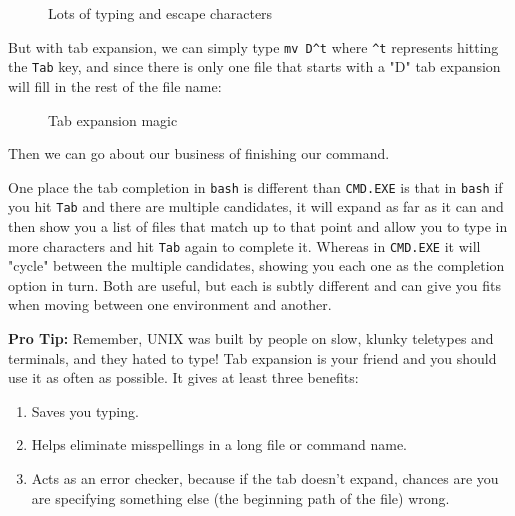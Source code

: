 \documentclass[10pt,american,]{book}
\newenvironment{Shaded}{\begin{snugshade}}{\end{snugshade}}
\newcommand{\KeywordTok}[1]{\textcolor[rgb]{0.13,0.29,0.53}{\textbf{{#1}}}}
\newcommand{\DataTypeTok}[1]{\textcolor[rgb]{0.13,0.29,0.53}{{#1}}}
\newcommand{\NormalTok}[1]{{#1}}
\numberwithin{figure}{chapter}
\DeclareRobustCommand{\drcap}[1]{\begin{figure}[H]\caption{#1}\end{figure}}
\renewcommand{\KeywordTok}[1]{{#1}}
\renewcommand{\DataTypeTok}[1]{{#1}}
\renewcommand{\NormalTok}[1]{{#1}}
\begin{document}
\drcap{Lots of typing and escape characters}

\begin{Shaded}
\end{Shaded}

But with tab expansion, we can simply type \texttt{mv\ D\^{}t} where
\texttt{\^{}t} represents hitting the \texttt{Tab} key, and since there
is only one file that starts with a "D" tab expansion will fill in the
rest of the file name:

\drcap{Tab expansion magic}

\begin{Shaded}
\end{Shaded}

Then we can go about our business of finishing our command.

One place the tab completion in \texttt{bash} is different than
\texttt{CMD.EXE} is that in \texttt{bash} if you hit \texttt{Tab} and
there are multiple candidates, it will expand as far as it can and then
show you a list of files that match up to that point and allow you to
type in more characters and hit \texttt{Tab} again to complete it.
Whereas in \texttt{CMD.EXE} it will "cycle" between the multiple
candidates, showing you each one as the completion option in turn. Both
are useful, but each is subtly different and can give you fits when
moving between one environment and another.

\textbf{Pro Tip:} Remember, UNIX was built by people on slow, klunky
teletypes and terminals, and they hated to type! Tab expansion is your
friend and you should use it as often as possible. It gives at least
three benefits:

\begin{enumerate}
\def\labelenumi{\arabic{enumi}.}
\item
  Saves you typing.
\item
  Helps eliminate misspellings in a long file or command name.
\item
  Acts as an error checker, because if the tab doesn't expand, chances
  are you are specifying something else (the beginning path of the file)
  wrong.
\end{enumerate}
\end{document}
